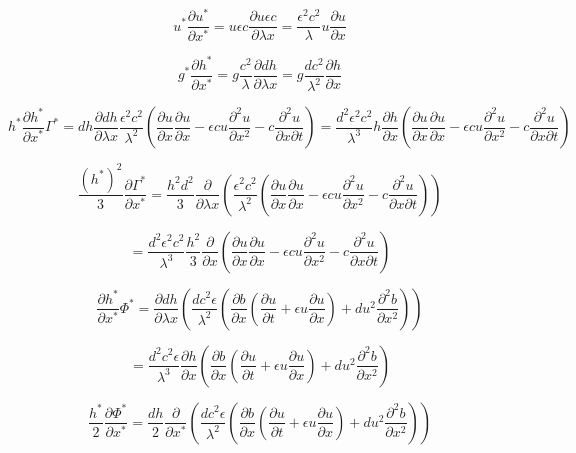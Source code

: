 \documentclass[12pt]{article}
\begin{document}
\[u^*\frac{\partial u^*}{\partial x^*} = u\epsilon c\frac{\partial u\epsilon c}{\partial \lambda x} = \frac{\epsilon^2c^2}{\lambda} u \frac{\partial u}{\partial x}\]

\[g^*\frac{\partial h^*}{\partial x^*} = g \frac{c^2}{\lambda}\frac{\partial dh}{\partial \lambda x} = g \frac{dc^2}{\lambda^2}\frac{\partial h}{\partial x}\]

\[h^*\frac{\partial h^*}{\partial x^*}\Gamma^* = dh\frac{\partial dh}{\partial \lambda x}\frac{\epsilon^2 c^2}{\lambda^2} \left(\frac{\partial u}{\partial x}\frac{\partial u}{\partial x} - \epsilon c u\frac{\partial^2 u}{\partial x^2} -  c\frac{\partial^2 u}{\partial x \partial t } \right) =  \frac{d^2\epsilon^2 c^2}{\lambda^3} h\frac{\partial h}{\partial x} \left(\frac{\partial u}{\partial x}\frac{\partial u}{\partial x} - \epsilon c u\frac{\partial^2 u}{\partial x^2} -  c\frac{\partial^2 u}{\partial x \partial t } \right) \]

\[\frac{\left(h^*\right)^2}{3}\frac{\partial \Gamma^*}{\partial x^*} = \frac{h^2d^2}{3}\frac{\partial}{\partial \lambda x}\left( \frac{\epsilon^2 c^2}{\lambda^2} \left(\frac{\partial u}{\partial x}\frac{\partial u}{\partial x} - \epsilon c u\frac{\partial^2 u}{\partial x^2} -  c\frac{\partial^2 u}{\partial x \partial t } \right)\right) \]

\[ = \frac{d^2 \epsilon^2 c^2}{\lambda^3} \frac{h^2}{3}\frac{\partial}{\partial x} \left(\frac{\partial u}{\partial x}\frac{\partial u}{\partial x} - \epsilon c u\frac{\partial^2 u}{\partial x^2} -  c\frac{\partial^2 u}{\partial x \partial t } \right) \]

\[\frac{\partial h^*}{\partial x^*}\Phi^* = \frac{\partial dh}{\partial \lambda x}\left(\frac{dc^2\epsilon}{\lambda^2}\left( \frac{\partial b}{\partial x}\left( \frac{\partial u}{\partial t } + \epsilon u\frac{\partial u}{\partial x}\right) + d u^2\frac{\partial^2 b}{\partial x^2} \right) \right)\]

\[= \frac{d^2c^2 \epsilon}{\lambda^3} \frac{\partial h}{\partial x}\left( \frac{\partial b}{\partial x}\left( \frac{\partial u}{\partial t } + \epsilon u\frac{\partial u}{\partial x}\right) + d u^2\frac{\partial^2 b}{\partial x^2}  \right)\]

\[\frac{h^*}{2}\frac{\partial \Phi^*}{\partial x^*} = \frac{dh}{2}\frac{\partial}{\partial x^*}\left(\frac{dc^2\epsilon}{\lambda^2}\left( \frac{\partial b}{\partial x}\left( \frac{\partial u}{\partial t } + \epsilon u\frac{\partial u}{\partial x}\right) + d u^2\frac{\partial^2 b}{\partial x^2} \right)\right)\]
\end{document}
